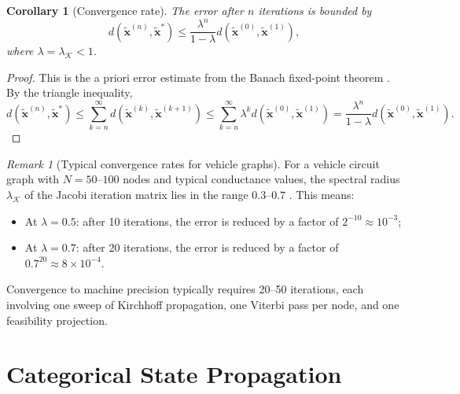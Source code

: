 \documentclass[twocolumn,10pt,a4paper]{article}
\newtheorem{corollary}[theorem]{Corollary}
\theoremstyle{definition}
\theoremstyle{remark}
\newtheorem{remark}[theorem]{Remark}
\newcommand{\vect}[1]{\boldsymbol{#1}}
\newcommand{\fuzzy}[1]{\widetilde{#1}}
\begin{document}
\begin{corollary}[Convergence rate]\label{cor:convergence_rate}
The error after $n$ iterations is bounded by
\begin{equation}\label{eq:convergence_rate}
d(\fuzzy{\vect{x}}^{(n)}, \fuzzy{\vect{x}}^*) \leq \frac{\lambda^n}{1 - \lambda} d(\fuzzy{\vect{x}}^{(0)}, \fuzzy{\vect{x}}^{(1)}),
\end{equation}
where $\lambda = \lambda_{\mathcal{K}} < 1$.
\end{corollary}

\begin{proof}
This is the a priori error estimate from the Banach fixed-point theorem \citep{Banach1922}. By the triangle inequality,
\begin{equation}
d(\fuzzy{\vect{x}}^{(n)}, \fuzzy{\vect{x}}^*) \leq \sum_{k=n}^{\infty} d(\fuzzy{\vect{x}}^{(k)}, \fuzzy{\vect{x}}^{(k+1)}) \leq \sum_{k=n}^{\infty} \lambda^k d(\fuzzy{\vect{x}}^{(0)}, \fuzzy{\vect{x}}^{(1)}) = \frac{\lambda^n}{1-\lambda} d(\fuzzy{\vect{x}}^{(0)}, \fuzzy{\vect{x}}^{(1)}).
\end{equation}
\end{proof}

\begin{remark}[Typical convergence rates for vehicle graphs]
For a vehicle circuit graph with $N = 50$--$100$ nodes and typical conductance values, the spectral radius $\lambda_{\mathcal{K}}$ of the Jacobi iteration matrix lies in the range $0.3$--$0.7$ \citep{Chung1997}. This means:
\begin{itemize}
\item At $\lambda = 0.5$: after 10 iterations, the error is reduced by a factor of $2^{-10} \approx 10^{-3}$;
\item At $\lambda = 0.7$: after 20 iterations, the error is reduced by a factor of $0.7^{20} \approx 8 \times 10^{-4}$.
\end{itemize}
Convergence to machine precision typically requires 20--50 iterations, each involving one sweep of Kirchhoff propagation, one Viterbi pass per node, and one feasibility projection.
\end{remark}


\section{Categorical State Propagation}\label{sec:propagation}
\end{document}
